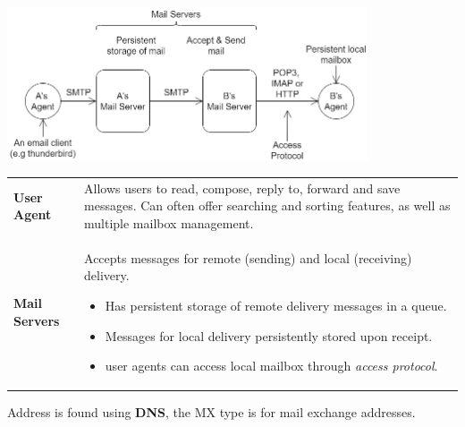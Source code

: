 \begin{center}\includegraphics[width=0.8\textwidth]{the_web/images/email route.png}\end{center}
\begin{center}
    \begin{tabular}{l p{}}
        \textbf{User Agent}   & Allows users to read, compose, reply to, forward and save messages. Can often offer searching and sorting features, as well as multiple mailbox management. \\
        \textbf{Mail Servers} & { Accepts messages for remote (sending) and local (receiving) delivery.
                \begin{itemize}
                    \setlength\itemsep{0em}
                    \item Has persistent storage of remote delivery messages in a queue.
                    \item Messages for local delivery persistently stored upon receipt.
                    \item user agents can access local mailbox through \textit{access protocol}.
                \end{itemize}
        }                                                                                                                                                                                   \\
    \end{tabular}
\end{center}
Address is found using \textbf{DNS}, the MX type is for mail exchange addresses.

